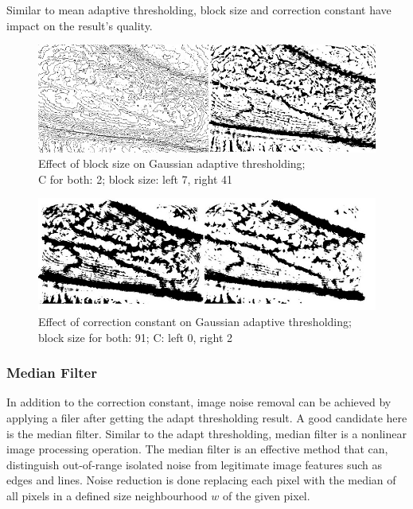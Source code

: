 Similar to mean adaptive thresholding, block size and correction constant have impact on the result’s quality.  

\begin{figure}[H]
\centering
\includegraphics[scale=0.8]{figures/compare3.JPG}
\captionsetup{justification=centering}
\caption[Effect of block size on Gaussian adaptive thresholding]{Effect of block size on Gaussian adaptive thresholding;\\C for both: 2; block size: left 7, right 41}\label{fig:compare3}
\end{figure}


\begin{figure}[H]
\centering
\includegraphics[scale=0.8]{figures/compare4.JPG}
\captionsetup{justification=centering}

\caption[Effect of correction constant on Gaussian adaptive thresholding]{Effect of correction constant on Gaussian adaptive thresholding;\\ block size for both: 91; C: left 0, right 2}\label{fig:compare4}
\end{figure}

\subsubsection{Median Filter}
In addition to the correction constant, image noise removal can be achieved by applying a filer after getting the adapt thresholding result. A good candidate here is the median filter. Similar to the adapt thresholding, median filter is a nonlinear image processing operation. The median filter is an effective method that can, distinguish out-of-range isolated noise from legitimate image features such as edges and lines. Noise reduction is done replacing each pixel with the median of all pixels in a defined size neighbourhood $w$ of the given pixel. 

